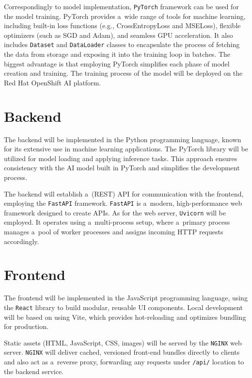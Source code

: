 Correspondingly to model implementation, \texttt{PyTorch} framework can be used for the model training. PyTorch provides a~wide range of tools for machine learning, including built-in loss functions (e.g., CrossEntropyLoss and MSELoss), flexible optimizers (such as SGD and Adam), and seamless GPU acceleration. It also includes \texttt{Dataset} and \texttt{DataLoader} classes to encapsulate the process of fetching the data from storage and exposing it into the training loop in batches. The biggest advantage is that employing PyTorch simplifies each phase of model creation and training. The training process of the model will be deployed on the Red Hat OpenShift AI platform.

\section*{Backend}
\label{sec:draft-be}

The backend will be implemented in the Python programming language, known for its extensive use in machine learning applications. The PyTorch library will be utilized for model loading and applying inference tasks. This approach ensures consistency with the AI model built in PyTorch and simplifies the development process.

The backend will establish a~(REST) API for communication with the frontend, employing the \texttt{FastAPI} framework. \texttt{FastAPI} is a~modern, high-performance web framework designed to create APIs. As for the web server, \texttt{Uvicorn} will be employed. It operates using a~multi-process setup, where a~primary process manages a~pool of worker processes and assigns incoming HTTP requests accordingly.

\section*{Frontend}
\label{sec:draft-fe}

The frontend will be implemented in the JavaScript programming language, using the \texttt{React} library to build modular, reusable UI components. Local development will be based on using Vite, which provides hot-reloading and optimizes bundling for production.

Static assets (HTML, JavaScript, CSS, images) will be served by the \texttt{NGINX} web server. \texttt{NGINX} will deliver cached, versioned front-end bundles directly to clients and also act as a~reverse proxy, forwarding any requests under \texttt{/api/} location to the backend service. 

